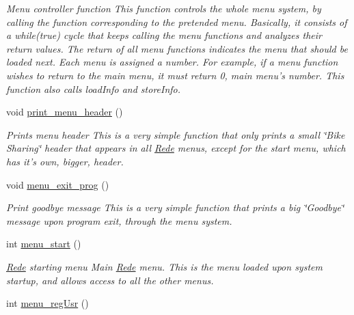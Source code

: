 \begin{DoxyCompactItemize}
\begin{DoxyCompactList}\small\item\em Menu controller function This function controls the whole menu system, by calling the function corresponding to the pretended menu. Basically, it consists of a while(true) cycle that keeps calling the menu functions and analyzes their return values. The return of all menu functions indicates the menu that should be loaded next. Each menu is assigned a number. For example, if a menu function wishes to return to the main menu, it must return 0, main menu's number. This function also calls load\+Info and store\+Info. \end{DoxyCompactList}\item 
\hypertarget{class_rede_a7f6b41951357f14d8be5c0c23f59bca9}{void \hyperlink{class_rede_a7f6b41951357f14d8be5c0c23f59bca9}{print\+\_\+menu\+\_\+header} ()}\label{class_rede_a7f6b41951357f14d8be5c0c23f59bca9}

\begin{DoxyCompactList}\small\item\em Prints menu header This is a very simple function that only prints a small \char`\"{}\+Bike Sharing\char`\"{} header that appears in all \hyperlink{class_rede}{Rede} menus, except for the start menu, which has it's own, bigger, header. \end{DoxyCompactList}\item 
\hypertarget{class_rede_ab94437bdbb3cb32b8489591748c1a57e}{void \hyperlink{class_rede_ab94437bdbb3cb32b8489591748c1a57e}{menu\+\_\+exit\+\_\+prog} ()}\label{class_rede_ab94437bdbb3cb32b8489591748c1a57e}

\begin{DoxyCompactList}\small\item\em Print goodbye message This is a very simple function that prints a big \char`\"{}\+Goodbye\char`\"{} message upon program exit, through the menu system. \end{DoxyCompactList}\item 
\hypertarget{class_rede_ad5f01d997329c28cc736b42e9962c2b6}{int \hyperlink{class_rede_ad5f01d997329c28cc736b42e9962c2b6}{menu\+\_\+start} ()}\label{class_rede_ad5f01d997329c28cc736b42e9962c2b6}

\begin{DoxyCompactList}\small\item\em \hyperlink{class_rede}{Rede} starting menu Main \hyperlink{class_rede}{Rede} menu. This is the menu loaded upon system startup, and allows access to all the other menus. \end{DoxyCompactList}\item 
\hypertarget{class_rede_aa36d94723cae863269eb20375c4491c4}{int \hyperlink{class_rede_aa36d94723cae863269eb20375c4491c4}{menu\+\_\+reg\+Usr} ()}\label{class_rede_aa36d94723cae863269eb20375c4491c4}


\end{DoxyCompactItemize}
